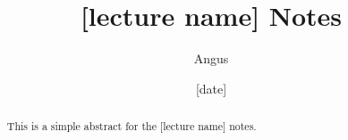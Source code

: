 \documentclass[12pt]{article}
\title{[lecture name] Notes}
\author{Angus}
\date{[date]}
\begin{document}
    \maketitle
    \begin{abstract}
        This is a simple abstract for the [lecture name] notes.
    \end{abstract}
\end{document}
